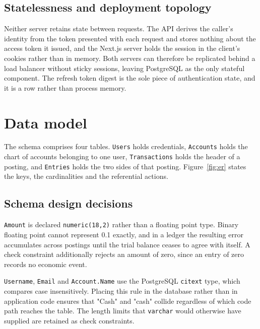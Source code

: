 \documentclass[11pt,a4paper]{article}
\newcommand{\code}[1]{\texttt{\fontsize{8.6}{10}\selectfont #1}}
\begin{document}
\subsection{Statelessness and deployment topology}

Neither server retains state between requests. The API derives the caller's
identity from the token presented with each request and stores nothing about the
access token it issued, and the Next.js server holds the session in the client's
cookies rather than in memory. Both servers can therefore be replicated behind a
load balancer without sticky sessions, leaving PostgreSQL as the only stateful
component. The refresh token digest is the sole piece of authentication state,
and it is a row rather than process memory.


\section{Data model}

The schema comprises four tables. \code{Users} holds credentials,
\code{Accounts} holds the chart of accounts belonging to one user,
\code{Transactions} holds the header of a posting, and \code{Entries} holds the
two sides of that posting. Figure~\ref{fig:er} states the keys, the
cardinalities and the referential actions.

\subsection{Schema design decisions}\label{sec:schema}

\code{Amount} is declared \code{numeric(18,2)} rather than a floating point
type. Binary floating point cannot represent 0.1 exactly, and in a ledger the
resulting error accumulates across postings until the trial balance ceases to
agree with itself. A check constraint additionally rejects an amount of zero,
since an entry of zero records no economic event.

\code{Username}, \code{Email} and \code{Account.Name} use the PostgreSQL
\code{citext} type, which compares case insensitively. Placing this rule in the
database rather than in application code ensures that "Cash" and "cash" collide
regardless of which code path reaches the table. The length limits that
\code{varchar} would otherwise have supplied are retained as check constraints.
\end{document}
